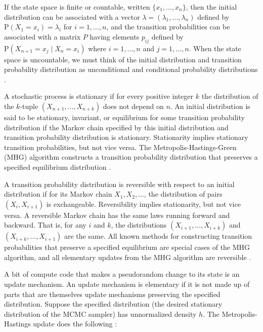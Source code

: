 \documentclass[../../../main.tex]{subfiles}
\begin{document}
If the state space is finite or countable, written $\{x_1,\ldots,x_n\}$, then the initial distribution can be associated with a vector $\lambda=(\lambda_1,\ldots,\lambda_n)$ defined by $\mathrm{P}(X_1=x_i)=\lambda_i$ for $i=1,\ldots,n$, and the transition probabilities can be associated with a matrix $P$ having elements $p_{ij}$ defined by $\mathrm{P}(X_{n+1}=x_j \mid X_n=x_i)$ where $i=1,\ldots,n$ and $j=1,\ldots,n$. When the state space is uncountable, we must think of the initial distribution and transition probability distribution as unconditional and conditional probability distributions \autocite{Brooks2011}.

A stochastic process is stationary if for every positive integer $k$ the distribution of the $k$-tuple $(X_{n+1},\allowbreak \ldots,\allowbreak X_{n+k})$ does not depend on $n$. An initial distribution is said to be stationary, invariant, or equilibrium for some transition probability distribution if the Markov chain specified by this initial distribution and transition probability distribution is stationary. Stationarity implies stationary transition probabilities, but not vice versa. The Metropolis-Hastings-Green (MHG) algorithm constructs a transition probability distribution that preserves a specified equilibrium distribution \autocite{Brooks2011}.

A transition probability distribution is reversible with respect to an initial distribution if for its Markov chain $X_1,X_2,\ldots$, the distribution of pairs $(X_i,X_{i+1})$ is exchangeable. Reversibility implies stationarity, but not vice versa. A reversible Markov chain has the same laws running forward and backward. That is, for any $i$ and $k$, the distributions $(X_{i+1},\ldots,X_{i+k})$ and $(X_{i+k},\ldots,X_{i+1})$ are the same. All known methods for constructing transition probabilities that preserve a specified equilibrium are special cases of the MHG algorithm, and all elementary updates from the MHG algorithm are reversible \autocite{Brooks2011}.

A bit of compute code that makes a pseudorandom change to its state is an update mechanism. An update mechanism is elementary if it is not made up of parts that are themselves update mechanisms preserving the specified distribution. Suppose the specified distribution (the desired stationary distribution of the MCMC sampler) has unnormalized density $h$. The Metropolis-Hastings update does the following \autocite{Brooks2011}:
\end{document}
